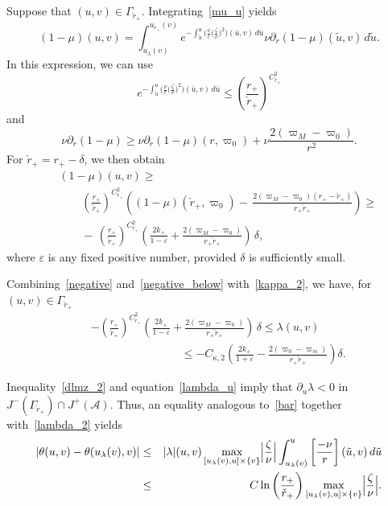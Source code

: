 \documentclass[a4paper,11pt,oneside,reqno]{amsart}
\newcommand{\kk}{k_+}
\newcommand{\cal}{\mathcal}
\newcommand{\eps}{\varepsilon}
\newcommand{\ckrp}{\check r_+}
\newcommand{\ugrp}{u_{\ckrp}}
\begin{document}
Suppose that $(u,v)\in \Gamma_{\ckrp}$. Integrating~\eqref{mu_u} yields
$$
(1-\mu)(u,v)=\int_{u_\lambda(v)}^{\ugrp(v)}e^{-\int_{\tilde u}^u\bigl(\frac{\nu}{r}\bigl(\frac\zeta\nu\bigr)^2\bigr)(\bar u,v)\,d\bar u}
\nu\partial_r(1-\mu)(\tilde u,v)\,d\tilde u.
$$
In this expression, we can use
$$
e^{-\int_{\tilde u}^u\bigl(\frac{\nu}{r}\bigl(\frac\zeta\nu\bigr)^2\bigr)(\bar u,v)\,d\bar u}
\leq\left(\frac{r_+}{\ckrp}\right)^{C_{\ckrp}^2}
$$
and
$$
\nu\partial_r(1-\mu)\geq\nu\partial_r(1-\mu)(r,\varpi_0)+\nu\frac{2(\varpi_M-\varpi_0)}{r^2}.
$$
For $\ckrp=r_+-\delta$, we then obtain
\begin{eqnarray}
&&(1-\mu)(u,v)\geq\nonumber\\
&&\qquad\left(\frac{r_+}{\ckrp}\right)^{C_{\ckrp}^2}
\left((1-\mu)(\ckrp,\varpi_0)-\,\frac{2(\varpi_M-\varpi_0)(r_+-\ckrp)}{r_+\ckrp}\right)\geq\nonumber\\
&&\qquad-\,\left(\frac{r_+}{\ckrp}\right)^{C_{\ckrp}^2}
\left(\frac{2\kk}{1-\eps}+\frac{2(\varpi_M-\varpi_0)}{r_+\ckrp}\right)\,\delta,\label{negative_below}
\end{eqnarray}
where $\eps$ is any fixed positive number,
provided $\delta$ is sufficiently small. 

Combining~\eqref{negative} and~\eqref{negative_below}
with~\eqref{kappa_2}, we have, for $(u,v)\in\Gamma_{\ckrp}$
\begin{eqnarray}
&&-\left(\frac{r_+}{\ckrp}\right)^{C_{\ckrp}^2}
\left(\frac{2\kk}{1-\eps}+\frac{2(\varpi_M-\varpi_0)}{r_+\ckrp}\right)\,\delta
\leq\lambda(u,v)\label{lambda_2}\\
&&\qquad\qquad\qquad\qquad
\leq-C_{\kappa,2}
\left(\frac{2\kk}{1+\eps}-\frac{2(\varpi_0-\varpi_m)}{r_+\ckrp}\right)\delta.
\nonumber
\end{eqnarray}

Inequality~\eqref{dlmz_2} and equation~\eqref{lambda_u} imply that $\partial_u\lambda<0$ in $J^-(\Gamma_{\ckrp})\cap J^+({\cal A})$.
Thus, an equality analogous to~\eqref{bar} together with~\eqref{lambda_2} yields
\begin{eqnarray*}
|\theta(u,v)-\theta(u_\lambda(v),v)|&\leq& |\lambda|(u,v)\max_{[u_\lambda(v),u]\times\{v\}}\Bigl|\frac{\zeta}{\nu}\Bigr|
\int_{u_\lambda(v)}^u\left[\frac{-\nu}{r}\right](\tilde u,v)\,d\tilde u\\
&\leq&C\ln\left({\frac{r_+}{\ckrp}}\right)
\max_{[u_\lambda(v),u]\times\{v\}}\Bigl|\frac{\zeta}{\nu}\Bigr|.
\end{eqnarray*}
\end{document}
